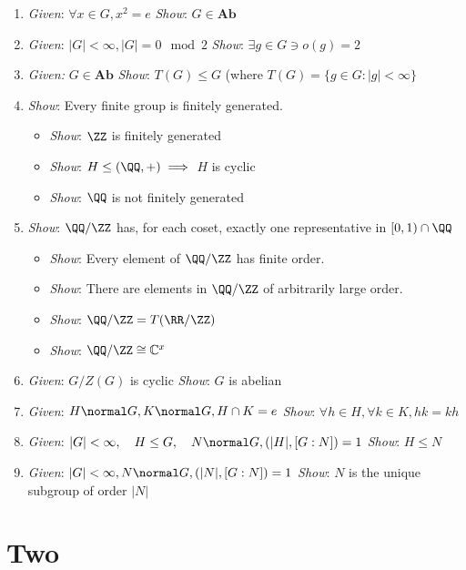 \begin{enumerate}
\def\labelenumi{\arabic{enumi}.}
\item
  \emph{Given}: $\forall x \in G, x^2 = e$ \emph{Show}:
  $G \in \mathbf{Ab}$
\item
  \emph{Given}: $|G|<\infty, |G| = 0\mod 2$ \emph{Show}:
  $\exists g\in G \ni o(g) = 2$
\item
  \emph{Given:} $G\in \mathbf{Ab}$ \emph{Show}: $T(G) \leq G$ (where
  $T(G) = \{ g\in G : |g| < \infty\}$
\item
  \emph{Show}: Every finite group is finitely generated.

  \begin{itemize}
  \tightlist
  \item
    \emph{Show}: $\ZZ$ is finitely generated
  \item
    \emph{Show}: $H \leq (\QQ, +) \implies$ $H$ is cyclic
  \item
    \emph{Show}: $\QQ$ is not finitely generated
  \end{itemize}
\item
  \emph{Show}: $\QQ/\ZZ$ has, for each coset, exactly one representative
  in $[0, 1) \cap \QQ$

  \begin{itemize}
  \tightlist
  \item
    \emph{Show}: Every element of $\QQ/\ZZ$ has finite order.
  \item
    \emph{Show}: There are elements in $\QQ/\ZZ$ of arbitrarily large
    order.
  \item
    \emph{Show}: $\QQ/\ZZ = T(\RR/\ZZ)$
  \item
    \emph{Show}: $\QQ/\ZZ \cong \mathbb{C}^x$
  \end{itemize}
\item
  \emph{Given}: $G/Z(G)$ is cyclic \emph{Show}: $G$ is abelian
\item
  \emph{Given}: $H \normal G, K \normal G,H \cap K = e$ \emph{Show}:
  $\forall h\in H, \forall k\in K, hk = kh$
\item
  \emph{Given}:
  $|G| < \infty, \quad H \leq G, \quad N \normal G, (|H|, [G:N]) = 1$
  \emph{Show}: $H \leq N$
\item
  \emph{Given}: $|G| < \infty, N \normal G, (|N|, [G:N]) =1$
  \emph{Show}: $N$ is the unique subgroup of order $|N|$
\end{enumerate}

\hypertarget{two}{%
\section{Two}\label{two}}

